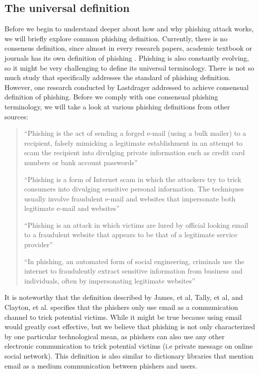 \subsection{The universal definition }

Before we begin to understand deeper about how and why phishing attack
works, we will briefly explore common phishing definition. Currently,
there is no consensus definition, since almost in every research papers,
academic textbook or journals has its own definition of phishing \citep{jakobsson:2006,james:2005,tally:2004,clayton:2005,parno:2006,jakobsson:2005,dhamija2006phishing}.
Phishing is also constantly evolving, so it might be very challenging
to define its universal terminology. There is not so much study that
specifically addresses the standard of phishing definition. However,
one research conducted by Lastdrager \citep{lastdrager:2014} addressed
to achieve consensual definition of phishing. Before we comply with
one consensual phishing terminology, we will take a look at various
phishing definitions from other sources:
\begin{quote}
``Phishing is the act of sending a forged e-mail (using a bulk mailer)
to a recipient, falsely mimicking a legitimate establishment in an
attempt to scam the recipient into divulging private information such
as credit card numbers or bank account passwords'' \citep{james:2005}

``Phishing is a form of Internet scam in which the attackers try
to trick consumers into divulging sensitive personal information.
The techniques usually involve fraudulent e-mail and websites that
impersonate both legitimate e-mail and websites'' \citep{tally:2004}

``Phishing is an attack in which victims are lured by official looking
email to a fraudulent website that appears to be that of a legitimate
service provider'' \citep{clayton:2005}

``In phishing, an automated form of social engineering, criminals
use the internet to fraudulently extract sensitive information from
business and individuals, often by impersonating legitimate websites''
\citep{parno:2006}
\end{quote}
It is noteworthy that the definition described by James, et al, Tally,
et al, and Clayton, et al. \citep{james:2005,tally:2004,clayton:2005}
specifies that the phishers only use email as a communication channel
to trick potential victims. While it might be true because using email
would greatly cost effective, but we believe that phishing is not
only characterized by one particular technological mean, as phishers
can also use any other electronic communication to trick potential
victims (i.e private message on online social network). This definition
is also similar to dictionary libraries \citep{oxford,collins,merriam}
that mention email as a medium communication between phishers and
users.


